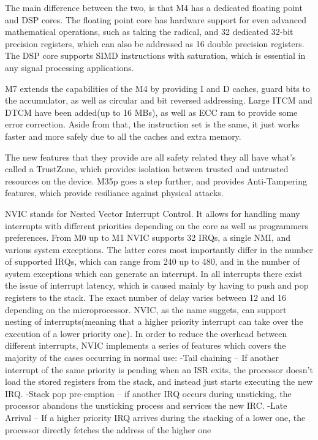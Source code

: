 \sol The main difference between the two, is that M4 has a dedicated floating point and DSP cores. The floating point core
     has hardware support for even advanced mathematical operations, such as taking the radical, and 32 dedicated 32-bit
     precision registers, which can also be addressed as 16 double precision registers. The DSP core supports SIMD instructions
     with saturation, which is essential in any signal processing applications.

\sol M7 extends the capabilities of the M4 by providing I and D caches, guard bits to the accumulator, as well as circular and bit reversed addressing.
     Large ITCM and DTCM have been added(up to 16 MBs), as well as ECC ram to provide some error correction. Aside from that, the instruction set
     is the same, it just works faster and more safely due to all the caches and extra memory.

\sol The new features that they provide are all safety related they all have what's called a TrustZone, which provides isolation between
     trusted and untrusted resources on the device. M35p goes a step further, and provides Anti-Tampering features, which provide resiliance
     against physical attacks.

\sol NVIC stands for Nested Vector Interrupt Control. It allows for handling many interrupts with different priorities depending
     on the core as well as programmers preferences. From M0 up to M1 NVIC supports 32 IRQs, a single NMI, and various system exceptions.
     The latter cores most importantly differ in the number of supported IRQs, which can range from 240 up to 480, and in the number of
     system exceptions which can generate an interrupt.
     In all interrupts there exist the issue of interrupt latency, which is caused mainly by having to push and pop registers to the stack.
     The exact number of delay varies between 12 and 16 depending on the microprocessor.
     NVIC, as the name suggets, can support nesting of interrupts(meaning that a higher priority interrupt can take over the execution of
     a lower priority one). In order to reduce the overhead between different interrupts, NVIC implements a series of features which covers
     the majority of the cases occurring in normal use:\newline
     -Tail chaining -- If another interrupt of the same priority is pending when an ISR exits, the processor doesn't load the stored registers from the stack, and
     instead just starts executing the new IRQ.
     -Stack pop pre-emption -- if another IRQ occurs during unsticking, the processor abandons the unsticking process and services the new IRC. \newline
     -Late Arrival -- If a higher priority IRQ arrives during the stacking of a lower one, the processor directly fetches the address of the higher one\newline

